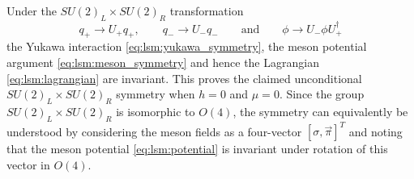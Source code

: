 Under the $SU(2)_L \times SU(2)_R$ transformation 
\begin{equation}
	q_+ \rightarrow U_+ q_+, \qquad
	q_- \rightarrow U_- q_-
	\qquad \text{and} \qquad
	\phi   \rightarrow U_- \phi U_+^\dagger
\end{equation}
the Yukawa interaction \eqref{eq:lsm:yukawa_symmetry},
the meson potential argument \eqref{eq:lsm:meson_symmetry}
and hence the Lagrangian \eqref{eq:lsm:lagrangian} are invariant.
This proves the claimed unconditional $SU(2)_L \times SU(2)_R$ symmetry when $h=0$ and $\mu=0$.
Since the group $SU(2)_L \times SU(2)_R$ is isomorphic to $O(4)$,
the symmetry can equivalently be understood by considering the meson fields as a four-vector $[\sigma, \vec{\pi}]^T$
and noting that the meson potential \eqref{eq:lsm:potential} is invariant under rotation of this vector in $O(4)$.


